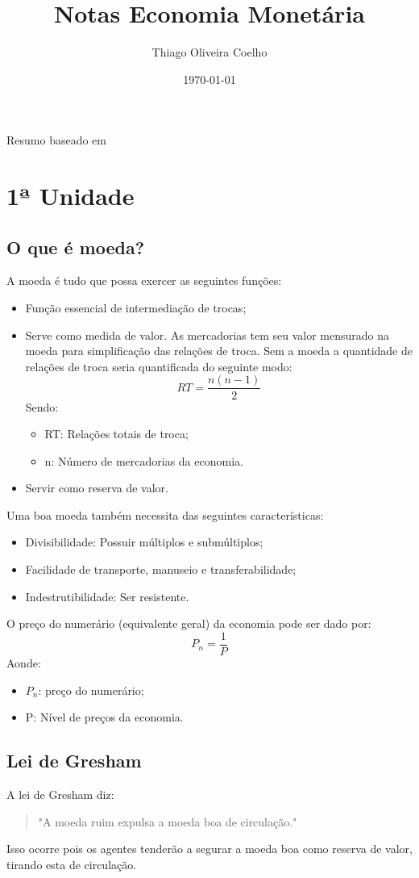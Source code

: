 \documentclass[12pt,a4paper,oneside,brazil]{abntex2}
\title{Notas Economia Monetária}
\author{Thiago Oliveira Coelho}
\date{\today}
\begin{document}
\pagestyle{plain}
\maketitle
\begin{center}
Resumo baseado em \cite{rossetti98}
\end{center}
\tableofcontents
\chapter{1ª Unidade}

\section{O que é moeda?}
A moeda é tudo que possa exercer as seguintes funções:
\begin{itemize}
\item Função essencial de intermediação de trocas;
\item Serve como medida de valor. As mercadorias tem seu valor mensurado na moeda para simplificação das relações de troca. Sem a moeda a quantidade de relações de troca seria quantificada do seguinte modo: 
\[ RT = \frac{n (n-1)}{2}\]
Sendo:
\begin{itemize}
\item RT: Relações totais de troca;
\item n: Número de mercadorias da economia.
\end{itemize}
\item Servir como reserva de valor.
\end{itemize}
Uma boa moeda também necessita das seguintes características:
\begin{itemize}
	\item Divisibilidade: Possuir múltiplos e submúltiplos;
\item Facilidade de transporte, manuseio e transferabilidade;
\item Indestrutibilidade: Ser resistente.
\end{itemize}

O preço do numerário (equivalente geral) da economia pode ser dado por:
\[P_n = \frac{1}{P}\] 
Aonde:
\begin{itemize}
\item $P_n$: preço do numerário;
\item P: Nível de preços da economia.
\end{itemize}

\section{Lei de Gresham}
A lei de Gresham diz: 
\begin{quote}
"A moeda ruim expulsa a moeda boa de circulação."
\end{quote}
Isso ocorre pois os agentes tenderão a segurar a moeda boa como reserva de valor, tirando esta de circulação.
\end{document}
